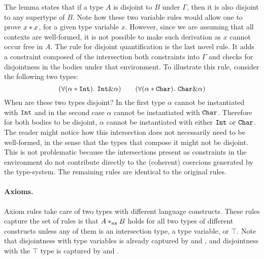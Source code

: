 The lemma states that if a type $A$ is disjoint to $B$ under $\Gamma$, then it is also disjoint
to any supertype of $B$. 
Note how these two variable rules would allow one to prove $x * x$, for a given type 
variable $x$.
However, since we are assuming that all contexts are well-formed, it is not possible to make
such derivation as $x$ cannot occur free in $A$. 
The rule for disjoint quantification  is the last novel rule. 
It adds a constraint composed of the intersection both constraints into $\Gamma$ and checks for 
disjointness in the bodies under that environment.
To illustrate this rule, consider the following two types:
\[ (\forall (\alpha * \texttt{Int}).~\texttt{Int} \& \alpha) \qquad 
(\forall (\alpha * \texttt{Char}). ~\texttt{Char} \& \alpha) \]
When are these two types disjoint?
In the first type $\alpha$ cannot be instantiated with $\texttt{Int}$ and in
the second case $\alpha$ cannot be instantiated with $\texttt{Char}$.
Therefore for both bodies to be disjoint, $\alpha$ cannot be instantiated with either $\texttt{Int}$ 
or $\texttt{Char}$. 
The reader might notice how this intersection does not necessarily need to be well-formed,
in the sense that the types that compose it might not be disjoint.
This is not problematic because the intersections present as constraints in the environment
do not contribute directly to the (coherent) coercions generated by the type-system.
The remaining rules are identical to the original rules. 

\paragraph{Axioms.} Axiom rules take care of two types with different language constructs.
These rules capture the set of rules is that $A *_\textnormal{ax} B$ holds for all 
two types of different constructs unless any of them is an intersection type, a type variable,
or $\top$.
Note that disjointness with type variables is already captured by  and 
, and disjointness with the $\top$ type is captured by 
{} and {}.


